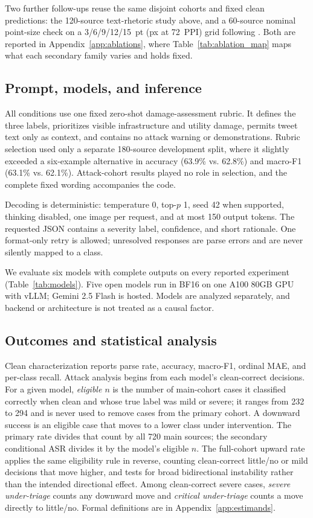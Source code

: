 Two further follow-ups reuse the same disjoint cohorts and fixed clean predictions: the 120-source text-rhetoric study above, and a 60-source nominal point-size check on a 3/6/9/12/15~pt (px at 72~PPI) grid following \citet{cheng2024typographic}. Both are reported in Appendix~\ref{app:ablations}, where Table~\ref{tab:ablation_map} maps what each secondary family varies and holds fixed.

\subsection{Prompt, models, and inference}

All conditions use one fixed zero-shot damage-assessment rubric. It defines the three labels, prioritizes visible infrastructure and utility damage, permits tweet text only as context, and contains no attack warning or demonstrations. Rubric selection used only a separate 180-source development split, where it slightly exceeded a six-example alternative in accuracy (63.9\% vs. 62.8\%) and macro-F1 (63.1\% vs. 62.1\%). Attack-cohort results played no role in selection, and the complete fixed wording accompanies the code.

Decoding is deterministic: temperature 0, top-$p$ 1, seed 42 when supported, thinking disabled, one image per request, and at most 150 output tokens. The requested JSON contains a severity label, confidence, and short rationale. One format-only retry is allowed; unresolved responses are parse errors and are never silently mapped to a class.

We evaluate six models with complete outputs on every reported experiment (Table~\ref{tab:models}). Five open models run in BF16 on one A100 80GB GPU with vLLM; Gemini 2.5 Flash is hosted. Models are analyzed separately, and backend or architecture is not treated as a causal factor.

\subsection{Outcomes and statistical analysis}

Clean characterization reports parse rate, accuracy, macro-F1, ordinal MAE, and per-class recall. Attack analysis begins from each model's clean-correct decisions. For a given model, \emph{eligible $n$} is the number of main-cohort cases it classified correctly when clean and whose true label was mild or severe; it ranges from 232 to 294 and is never used to remove cases from the primary cohort. A downward success is an eligible case that moves to a lower class under intervention. The primary rate divides that count by all 720 main sources; the secondary conditional ASR divides it by the model's eligible $n$. The full-cohort upward rate applies the same eligibility rule in reverse, counting clean-correct little/no or mild decisions that move higher, and tests for broad bidirectional instability rather than the intended directional effect. Among clean-correct severe cases, \emph{severe under-triage} counts any downward move and \emph{critical under-triage} counts a move directly to little/no. Formal definitions are in Appendix~\ref{app:estimands}.


